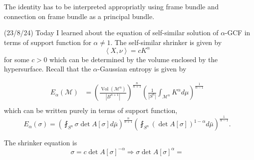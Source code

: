 \documentclass[12pt,a4paper]{article}
\begin{document}
The identity has to be interpreted appropriatly using frame bundle and connection on frame bundle as a principal bundle. 

(23/8/24) Today I learned about the equation of self-similar solution of $ \alpha $-GCF in terms of support function for $ \alpha \neq 1 $. The self-similar shrinker is given by 
\[ \left< X,\nu \right> = c K^{\alpha}\]
for some $ c>0 $ which can be determined by the volume enclosed by the hypersurface. Recall that the $ \alpha $-Gaussian entropy is given by 

\begin{align*}
   E_{\alpha}(\mathcal{M}) & = \left(\frac{\operatorname{Vol}\left(\mathcal{M}^n\right)}{\left|B^{n+1}\right|}\right)^{\frac{n}{n+1}}\left(\frac{1}{\left|S^n\right|} \int_{\mathcal{M}^n} K^\alpha d \mu\right)^{\frac{1}{\alpha-1}} \\
\end{align*}
which can be written purely in terms of support function, 
\[ E_{\alpha}(\sigma) = \left( \fint_{S^{n}} \sigma \det A[\sigma] d\bar{\mu}\right)^{\frac{n}{n+1}} \left( \fint_{S^{n}} (\det A[\sigma])^{1-\alpha} d \bar{\mu} \right)^{\frac{1}{\alpha -1}}. \]

The shrinker equation is 
\[ \sigma = c \det A[\sigma]^{-\alpha}  \Rightarrow \sigma \det A[\sigma]^{\alpha} = \]
\end{document}
